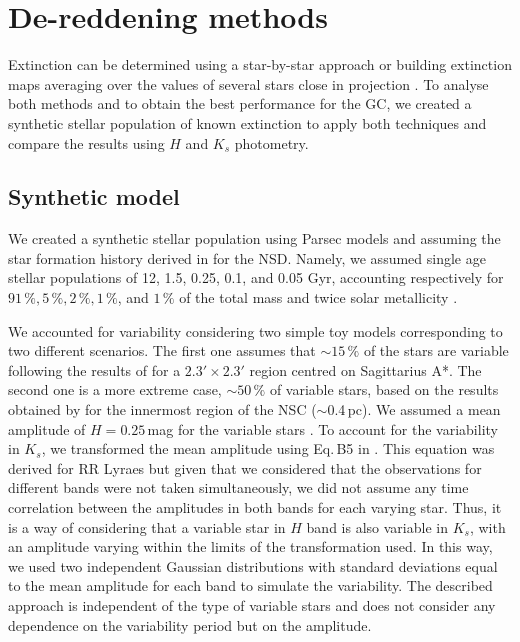 \documentclass{aa}
\begin{document}


%






\appendix


\section{De-reddening methods}
\label{app}

Extinction can be determined using a star-by-star approach \citep[e.g.][]{Fritz:2020aa} or building extinction maps averaging over the values of several stars close in projection \citep[e.g.][]{Schodel:2010fk,Nogueras-Lara:2018aa,Nogueras-Lara:2019ad,Fritz:2020aa}. To analyse both methods and to obtain the best performance for the GC, we created a synthetic stellar population of known extinction to apply both techniques and compare the results using $H$ and $K_s$ photometry.

\subsection{Synthetic model}
\label{synt}

We created a synthetic stellar population using Parsec models \citep[release v1.2S + COLIBRI S\_35 + PR16, ][]{Bressan:2012aa,Chen:2014aa,Chen:2015aa,Tang:2014rm,Marigo:2017aa,Pastorelli:2019aa} and assuming the star formation history derived in \citet{Nogueras-Lara:2019ad} for the NSD. Namely, we assumed single age stellar populations of 12, 1.5, 0.25, 0.1, and 0.05 Gyr, accounting respectively for $91\,\%, 5\,\%, 2\,\%, 1\,\%$, and $1\,\%$ of the total mass and twice solar metallicity \citep[e.g.][]{Feldmeier-Krause:2017kq,Schultheis:2019aa,Nogueras-Lara:2019ad}. 

We accounted for variability considering two simple toy models corresponding to two different scenarios. The first one assumes that $\sim15\,\%$ of the stars are variable following the results of \citet{2017MNRAS.470.3427D} for a $2.3'\times2.3'$ region centred on Sagittarius A*. The second one is a more extreme case, $\sim50\,\%$ of variable stars, based on the results obtained by \citet{Gautam:2019aa} for the innermost region of the NSC ($\sim$0.4\,pc). We assumed a mean amplitude of $H=0.25$\,mag for the variable stars \citep[see Fig. 9 in][]{2017MNRAS.470.3427D}. To account for the variability in $K_s$, we transformed the mean amplitude using Eq.\,B5 in \citet{Feast:2008aa}. This equation was derived for RR Lyraes but given that we considered that the observations for different bands were not taken simultaneously, we did not assume any time correlation between the amplitudes in both bands for each varying star. Thus, it is a way of considering that a variable star in $H$ band is also variable in $K_s$, with an amplitude varying within the limits of the transformation used. In this way, we used two independent Gaussian distributions with standard deviations equal to the mean amplitude for each band to simulate the variability. The described approach is independent of the type of variable stars and does not consider any dependence on the variability period but on the amplitude.
\end{document}
